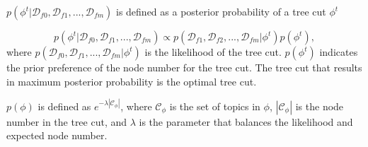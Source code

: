 $p({\phi}^t|\mathcal{D}_{f0},\mathcal{D}_{f1}, ..., \mathcal{D}_{fm})$ is defined as a posterior probability of a tree cut ${\phi}^t$

\vspace{-5mm}
\begin{equation}
\label{eq:seed}
p({\phi}^t|\mathcal{D}_{f0}, \mathcal{D}_{f1}, ..., \mathcal{D}_{fm}) \propto p(\mathcal{D}_{f1}, \mathcal{D}_{f2}, ..., \mathcal{D}_{fm}|{\phi}^t) p({\phi}^t),
\end{equation}
where $p(\mathcal{D}_{f0}, \mathcal{D}_{f1}, ..., \mathcal{D}_{fm}|{\phi}^t)$ is the likelihood of the tree cut.
$p({\phi}^t)$ indicates the prior preference of the node number for the tree cut.
The tree cut that results in maximum posterior probability is the optimal tree cut.

$p({\phi})$ is defined as $e^{-\lambda|\mathcal{C}_{{\phi}}|}$, where $\mathcal{C}_{{\phi}}$ is the set of topics in ${\phi}$, $|\mathcal{C}_{\phi}|$ is the node number in the tree cut, and $\lambda$ is the parameter that balances the
likelihood and expected node number.

